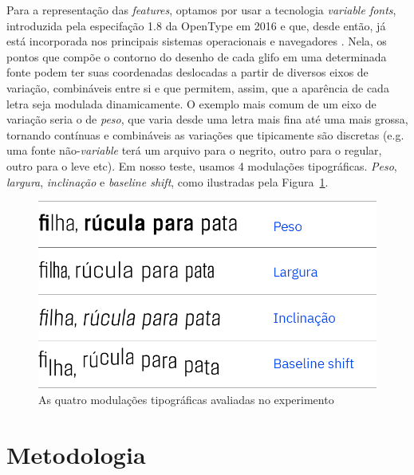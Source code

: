 \documentclass[11pt]{article}
\begin{document}
  Para a representação das {\itshape features}, optamos por usar a tecnologia {\itshape variable fonts}, introduzida pela especifação 1.8 da OpenType \cite{varfontssepcs} em 2016 e que, desde então, já está incorporada nos principais sistemas operacionais e navegadores \cite{varfontossupport}. Nela, os pontos que compõe o contorno do desenho de cada glifo em uma determinada fonte podem ter suas coordenadas deslocadas a partir de diversos eixos de variação, combináveis entre si e que permitem, assim, que a aparência de cada letra seja modulada dinamicamente. O exemplo mais comum de um eixo de variação seria o de {\itshape peso}, que varia desde uma letra mais fina até uma mais grossa, tornando contínuas e combináveis as variações que tipicamente são discretas (e.g. uma fonte não-{\itshape variable} terá um arquivo para o negrito, outro para o regular, outro para o leve etc). Em nosso teste, usamos 4 modulações tipográficas. {\itshape Peso}, {\itshape largura}, {\itshape inclinação} e {\itshape baseline shift}, como ilustradas pela Figura~\ref{fig:type_modulations}.
  
\begin{figure}[H]
     {\centering
    \includegraphics[width=\linewidth]{fig/modulacoes.png}
     \caption{As quatro modulações tipográficas avaliadas no experimento}
     \label{fig:type_modulations}\par}
\end{figure}
  
  \section{Metodologia}
  \label{sec:metodologia}
 
\end{document}

